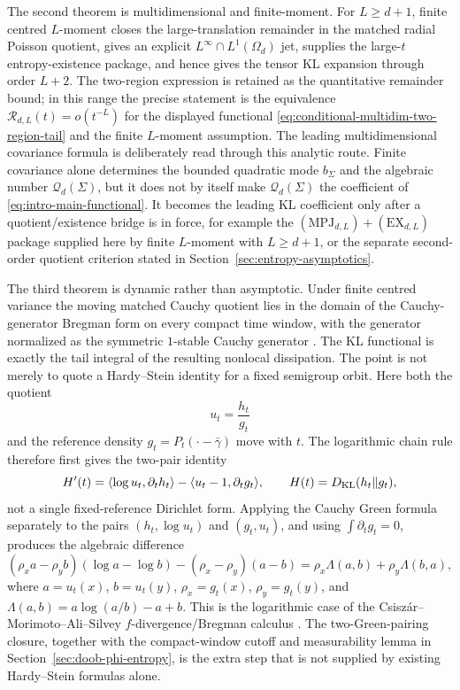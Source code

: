 The second theorem is multidimensional and finite-moment.  For
\(L\ge d+1\), finite centred \(L\)-moment closes the large-translation
remainder in the matched radial Poisson quotient, gives an explicit
\(L^\infty\cap L^1(\Omega_d)\) jet, supplies the large-\(t\)
entropy-existence package, and hence gives the tensor KL expansion through
order \(L+2\).  The two-region expression is retained as the quantitative
remainder bound; in this range the precise statement is the equivalence
\(\mathcal R_{d,L}(t)=o(t^{-L})\) for the displayed functional
\eqref{eq:conditional-multidim-two-region-tail} and the finite
\(L\)-moment assumption.
The leading multidimensional covariance formula is deliberately read through
this analytic route.  Finite covariance alone determines the bounded quadratic
mode \(b_\Sigma\) and the algebraic number \(\mathcal Q_d(\Sigma)\), but it
does not by itself make \(\mathcal Q_d(\Sigma)\) the coefficient of
\eqref{eq:intro-main-functional}.  It becomes the leading KL coefficient only
after a quotient/existence bridge is in force, for example the
\((\mathrm{MPJ}_{d,L})+(\mathrm{EX}_{d,L})\) package supplied here by
finite \(L\)-moment with \(L\ge d+1\), or the separate second-order quotient
criterion stated in Section~\ref{sec:entropy-asymptotics}.

The third theorem is dynamic rather than asymptotic.  Under finite centred
variance the moving matched Cauchy quotient lies in the domain of the
Cauchy-generator Bregman form on every compact time window, with the generator
normalized as the symmetric \(1\)-stable Cauchy generator
\cite{Feller1971,Bertoin1996LevyProcesses,Sato1999LevyProcesses,
Applebaum2009LevyProcesses,Kwasnicki2017}.  The KL functional is exactly the
tail integral of the resulting nonlocal dissipation.
The point is not merely to quote a Hardy--Stein identity for a fixed
semigroup orbit.  Here both the quotient
\[
u_t=\frac{h_t}{g_t}
\]
and the reference density \(g_t=P_t(\cdot-\bar\gamma)\) move with \(t\).
The logarithmic chain rule therefore first gives the two-pair identity
\begin{equation}\label{eq:intro-two-pair-chain-rule}
H'(t)=\langle \log u_t,\partial_t h_t\rangle
      -\langle u_t-1,\partial_t g_t\rangle,
\qquad H(t)=D_{\rm KL}(h_t\|g_t),
\end{equation}
not a single fixed-reference Dirichlet form.  Applying the Cauchy Green
formula separately to the pairs \((h_t,\log u_t)\) and \((g_t,u_t)\), and
using \(\int\partial_tg_t=0\), produces the algebraic difference
\[
(\rho_xa-\rho_yb)(\log a-\log b)-(\rho_x-\rho_y)(a-b)
=\rho_x\Lambda(a,b)+\rho_y\Lambda(b,a),
\]
where \(a=u_t(x)\), \(b=u_t(y)\), \(\rho_x=g_t(x)\),
\(\rho_y=g_t(y)\), and
\(\Lambda(a,b)=a\log(a/b)-a+b\).  This is the logarithmic case of the
Csisz{\'a}r--Morimoto--Ali--Silvey \(f\)-divergence/Bregman calculus
\cite{AliSilvey1966Divergence,Csiszar1967,Morimoto1963Markov,
Vajda1989TheoryDivergence,Bregman1967}.  The two-Green-pairing closure,
together with the compact-window cutoff and measurability lemma in
Section~\ref{sec:doob-phi-entropy}, is the extra step that is not supplied
by existing Hardy--Stein formulas alone.

